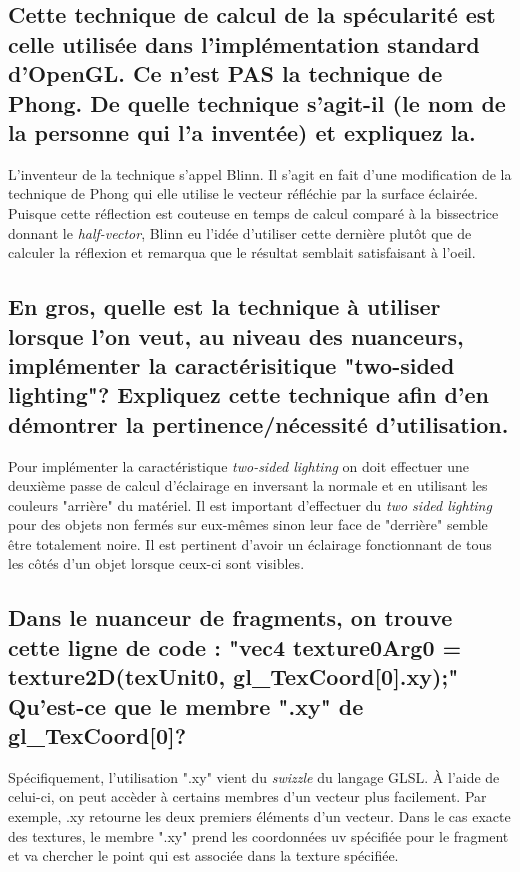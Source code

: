 \documentclass[a4paper, 12pt]{article} %
\begin{document}
\subsection*{Cette technique de calcul de la spécularité est celle utilisée dans l'implémentation
             standard d'OpenGL. Ce n'est PAS la technique de Phong. De quelle technique s'agit-il
             (le nom de la personne qui l'a inventée) et expliquez la.}

L'inventeur de la technique s'appel Blinn. Il s'agit en fait d'une modification de la technique
de Phong qui elle utilise le vecteur réfléchie par la surface éclairée. Puisque cette réflection
est couteuse en temps de calcul comparé à la bissectrice donnant le \textit{half-vector}, Blinn
eu l'idée d'utiliser cette dernière plutôt que de calculer la réflexion et remarqua que le 
résultat semblait satisfaisant à l'oeil.

\subsection*{En gros, quelle est la technique à utiliser lorsque l'on veut, au niveau des nuanceurs,
             implémenter la caractérisitique "two-sided lighting"? Expliquez cette technique
             afin d'en démontrer la pertinence/nécessité d'utilisation.}

Pour implémenter la caractéristique \textit{two-sided lighting} on doit effectuer une deuxième
passe de calcul d'éclairage en inversant la normale et en utilisant les couleurs "arrière" du 
matériel. Il est important d'effectuer du \textit{two sided lighting} pour des objets non
fermés sur eux-mêmes sinon leur face de "derrière" semble être totalement noire. Il est pertinent
d'avoir un éclairage fonctionnant de tous les côtés d'un objet lorsque ceux-ci sont visibles.

\subsection*{Dans le nuanceur de fragments, on trouve cette ligne de code : "vec4 texture0Arg0 = 
             texture2D(texUnit0, gl\_TexCoord[0].xy);" Qu'est-ce que le membre ".xy" de 
             gl\_TexCoord[0]?}

Spécifiquement, l'utilisation ".xy" vient du \textit{swizzle} du langage GLSL. À l'aide de celui-ci,
on peut accèder à certains membres d'un vecteur plus facilement. Par exemple, .xy retourne les deux premiers
éléments d'un vecteur. Dans le cas exacte des textures, le membre ".xy" prend les coordonnées uv
spécifiée pour le fragment et va chercher le point qui est associée dans la texture spécifiée.
\end{document}
